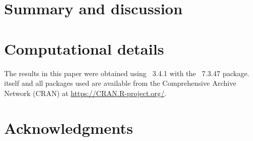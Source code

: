 \documentclass[article]{jss}
\begin{document}









\section{Summary and discussion} \label{sec:summary}



\section*{Computational details}


The results in this paper were obtained using
~3.4.1 with the
~7.3.47 package.  itself
and all packages used are available from the Comprehensive
 Archive Network (CRAN) at
\url{https://CRAN.R-project.org/}.


\section*{Acknowledgments}

\end{document}
